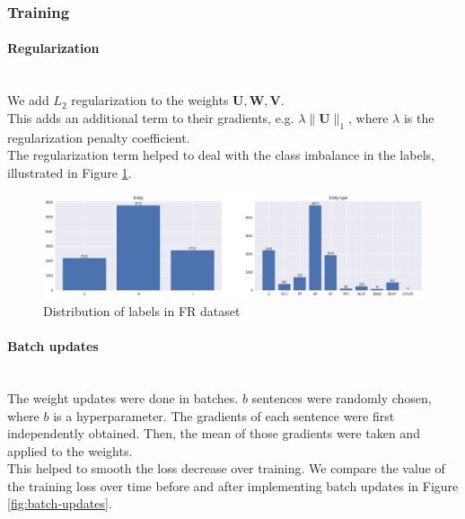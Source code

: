 \documentclass{article}
\begin{document}
\subsubsection{Training}
\paragraph{Regularization}\mbox{}\\
We add $L_2$ regularization to the weights $\bm{U}, \bm{W}, \bm{V}$.\\
This adds an additional term to their gradients, e.g. $\lambda \lVert\bm{U}\rVert_1$, where $\lambda$ is the regularization penalty coefficient.\\

The regularization term helped to deal with the class imbalance in the labels, illustrated in Figure \ref{fig:class-labels}.

\begin{figure}[h]
	\centering
	\includegraphics[width=0.9\linewidth]{assets/class_labels.png}
	\caption{Distribution of labels in FR dataset}
	\label{fig:class-labels}
\end{figure}

\paragraph{Batch updates}\mbox{}\\
The weight updates were done in batches. $b$ sentences were randomly chosen, where $b$ is a hyperparameter. The gradients of each sentence were first independently obtained. Then, the mean of those gradients were taken and applied to the weights.\\

This helped to smooth the loss decrease over training. We compare the value of the training loss over time before and after implementing batch updates in Figure \ref{fig:batch-updates}.
\end{document}
